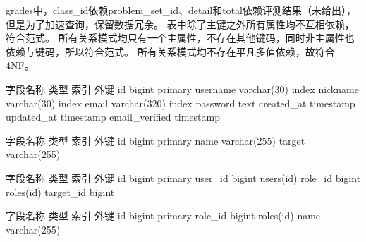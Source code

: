 {}grades中，class\_id依赖problem\_set\_id、detail和total依赖评测结果（未给出），但是为了加速查询，保留数据冗余。\markdownRendererInterblockSeparator
{}\markdownRendererInterblockSeparator
{}表中除了主键之外所有属性均不互相依赖，符合范式。\markdownRendererInterblockSeparator
{}\markdownRendererInterblockSeparator
{}所有关系模式均只有一个主属性，不存在其他键码，同时非主属性也依赖与键码，所以符合范式。\markdownRendererInterblockSeparator
{}\markdownRendererInterblockSeparator
{}所有关系模式均不存在平凡多值依赖，故符合4NF。\markdownRendererInterblockSeparator
{}\markdownRendererInterblockSeparator
{}\markdownRendererInterblockSeparator
{}\begin{center}\markdownRendererInterblockSeparator
{}%
{{字段名称}%
{类型}%
{索引}%
{外键}%
}%
{{id}%
{bigint}%
{primary}%
{}%
}%
{{username}%
{varchar(30)}%
{index}%
{}%
}%
{{nickname}%
{varchar(30)}%
{index}%
{}%
}%
{{email}%
{varchar(320)}%
{index}%
{}%
}%
{{password}%
{text}%
{}%
{}%
}%
{{created\_at}%
{timestamp}%
{}%
{}%
}%
{{updated\_at}%
{timestamp}%
{}%
{}%
}%
{{email\_verified}%
{timestamp}%
{}%
{}%
}%
\markdownRendererInterblockSeparator
{}\end{center}\markdownRendererInterblockSeparator
{}\markdownRendererInterblockSeparator
{}\begin{center}\markdownRendererInterblockSeparator
{}%
{{字段名称}%
{类型}%
{索引}%
{外键}%
}%
{{id}%
{bigint}%
{primary}%
{}%
}%
{{name}%
{varchar(255)}%
{}%
{}%
}%
{{target}%
{varchar(255)}%
{}%
{}%
}%
\markdownRendererInterblockSeparator
{}\end{center}\markdownRendererInterblockSeparator
{}\markdownRendererInterblockSeparator
{}\begin{center}\markdownRendererInterblockSeparator
{}%
{{字段名称}%
{类型}%
{索引}%
{外键}%
}%
{{id}%
{bigint}%
{primary}%
{}%
}%
{{user\_id}%
{bigint}%
{}%
{users(id)}%
}%
{{role\_id}%
{bigint}%
{}%
{roles(id)}%
}%
{{target\_id}%
{bigint}%
{}%
{}%
}%
\markdownRendererInterblockSeparator
{}\end{center}\markdownRendererInterblockSeparator
{}\markdownRendererInterblockSeparator
{}\begin{center}\markdownRendererInterblockSeparator
{}%
{{字段名称}%
{类型}%
{索引}%
{外键}%
}%
{{id}%
{bigint}%
{primary}%
{}%
}%
{{role\_id}%
{bigint}%
{}%
{roles(id)}%
}%
{{name}%
{varchar(255)}%
{}%
{}%
}%
\markdownRendererInterblockSeparator
{}\end{center}\markdownRendererInterblockSeparator
